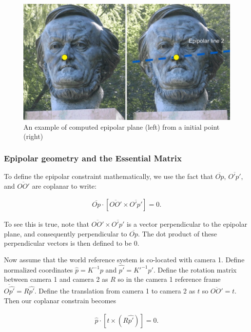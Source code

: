 \documentclass[twoside]{article}
\begin{document}
\begin{figure}[h!]
  \begin{center}
	\includegraphics[scale=0.3]{correspondence2.jpg}  \end{center}
  \caption{An example of computed epipolar plane (left) from a initial point (right)}
  \label{correspondence}
\end{figure}

\subsubsection{Epipolar geometry and the Essential Matrix}

To define the epipolar constraint mathematically, we use the fact that $\overline{Op}$, $\overline{O'p'}$, and $\overline{OO'}$ are coplanar to write:

\begin{align}
\overline{Op} \cdot [\overline{OO'} \times \overline{O'p'}] = 0.
\end{align}

To see this is true, note that $\overline{OO'} \times \overline{O'p'}$ is a vector perpendicular to the epipolar plane, and consequently perpendicular to $\overline{Op}$. The dot product of these perpendicular vectors is then defined to be 0. 

Now assume that the world reference system is co-located with camera 1. Define normalized coordinates $\hat{p} = K^{-1}p$ and $\hat{p'} = K'^{-1}p'$. Define the rotation matrix between camera 1 and camera 2 as $R$ so in the camera 1 reference frame $\overline{O\hat{p'}} = R\hat{p'}$. Define the translation from camera 1 to camera 2 as $t$ so $\overline{OO'} = t$. Then our coplanar constrain becomes

\begin{align}
\hat{p} \cdot [t \times (R\hat{p'})] = 0.
\end{align}
\end{document}
